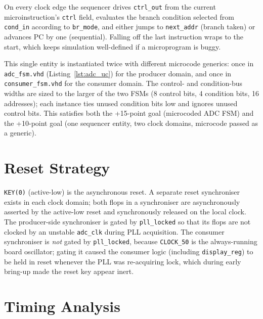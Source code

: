 \documentclass[12pt,letterpaper]{article}
\begin{document}
On every clock edge the sequencer drives \texttt{ctrl\_out} from the current
microinstruction's \texttt{ctrl} field, evaluates the branch condition
selected from \texttt{cond\_in} according to \texttt{br\_mode}, and either
jumps to \texttt{next\_addr} (branch taken) or advances PC by one (sequential).
Falling off the last instruction wraps to the start, which keeps simulation
well-defined if a microprogram is buggy.

This single entity is instantiated twice with different microcode generics:
once in \texttt{adc\_fsm.vhd} (Listing~\ref{lst:adc_uc}) for the producer
domain, and once in \texttt{consumer\_fsm.vhd} for the consumer domain.  The
control- and condition-bus widths are sized to the larger of the two FSMs (8
control bits, 4 condition bits, 16 addresses); each instance ties unused
condition bits low and ignores unused control bits.  This satisfies both the
+15-point goal (microcoded ADC FSM) and the +10-point goal (one sequencer
entity, two clock domains, microcode passed as a generic).

\section{Reset Strategy}
\label{sec:reset}

\texttt{KEY(0)} (active-low) is the asynchronous reset.  A separate reset
synchroniser exists in each clock domain; both flops in a synchroniser are
asynchronously asserted by the active-low reset and synchronously released on
the local clock.  The producer-side synchroniser is gated by
\texttt{pll\_locked} so that its flops are not clocked by an unstable
\texttt{adc\_clk} during PLL acquisition.  The consumer synchroniser is
\emph{not} gated by \texttt{pll\_locked}, because \texttt{CLOCK\_50} is the
always-running board oscillator; gating it caused the consumer logic
(including \texttt{display\_reg}) to be held in reset whenever the PLL was
re-acquiring lock, which during early bring-up made the reset key appear
inert.

\section{Timing Analysis}
\label{sec:timing}
\end{document}
